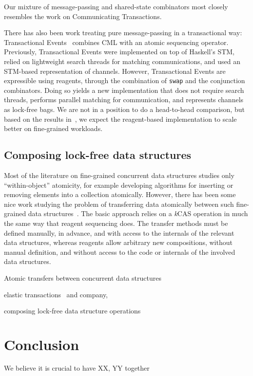 \documentclass[preprint]{sigplanconf}
\begin{document}
Our mixture of message-passing and shared-state combinators most closely
resembles the work on Communicating Transactions.   %


There has also been work treating pure message-passing in a transactional way:
Transactional Events~\cite{Donnelly2006} combines CML with an atomic
sequencing operator.  Previously, Transactional Events were implemented on top
of Haskell's STM, relied on lightweight search threads for matching
communications, and used an STM-based representation of channels.  However,
Transactional Events are expressible using reagents, through the combination
of \lstinline{swap} and the conjunction combinators.  Doing so yields a new
implementation that does not require search threads, performs parallel
matching for communication, and represents channels as lock-free bags.  We are
not in a position to do a head-to-head comparison, but based on the results
in~, we expect the reagent-based implementation to scale
better on fine-grained workloads.

\subsection{Composing lock-free data structures}

Most of the literature on fine-grained concurrent data structures studies only
``within-object'' atomicity, for example developing algorithms for inserting
or removing elements into a collection atomically.  However, there has been
some nice work studying the problem of transferring data atomically between
such fine-grained data structures~\cite{Cederman2010}.  The basic approach
relies on a \emph{k}CAS operation in much the same way that reagent sequencing
does.  The transfer methods must be defined manually, in advance, and with
access to the internals of the relevant data structures, whereas reagents
allow arbitrary new compositions, without manual definition, and without
access to the code or internals of the involved data structures.  

Atomic transfers between concurrent data structures 

elastic transactions~\cite{Felber2009} and company,

composing lock-free data structure operations~\cite{Cederman2010}

\section{Conclusion}

We believe it is crucial to have XX, YY together




\end{document}
